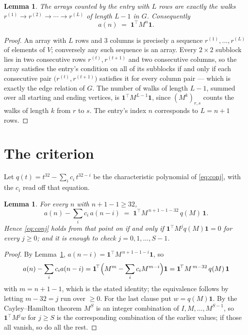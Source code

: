 \documentclass[11pt,a4paper]{article}
\theoremstyle{plain}
\newtheorem{lemma}[theorem]{Lemma}
\theoremstyle{definition}
\begin{document}
\begin{lemma}\label{lem:walk}
The arrays counted by the entry with $L$ rows are exactly the walks
$r^{(1)}\to r^{(2)}\to\cdots\to r^{(L)}$ of length $L-1$ in $G$. Consequently
\[
a(n)\;=\;\mathbf{1}^{\!\top}M^{n}\mathbf{1} .
\]
\end{lemma}

\begin{proof}
An array with $L$ rows and $3$ columns is precisely a sequence
$r^{(1)},\dots,r^{(L)}$ of elements of $V$; conversely any such sequence is an array.
Every $2\times2$ subblock lies in two consecutive rows $r^{(t)},r^{(t+1)}$ and two
consecutive columns, so the array satisfies the entry's condition on all of its subblocks
if and only if each consecutive pair $\bigl(r^{(t)},r^{(t+1)}\bigr)$ satisfies it for
every column pair --- which is exactly the edge relation of $G$. The number of walks of
length $L-1$, summed over all starting and ending vertices, is
$\mathbf{1}^{\!\top}M^{L-1}\mathbf{1}$, since $(M^{k})_{r,s}$ counts the walks of
length $k$ from $r$ to $s$. The entry's index $n$ corresponds to $L=n+1$ rows.
\end{proof}

\section{The criterion}

Let $q(t)=t^{32}-\sum_i c_i\,t^{32-i}$ be the characteristic polynomial of
\eqref{eq:conj}, with the $c_i$ read off that equation.

\begin{lemma}\label{lem:crit}
For every $n$ with $n+1-1\ge32$,
\[
a(n)-\sum_i c_i\,a(n-i)\;=\;\mathbf{1}^{\!\top}M^{\,n+1-1-32}\,q(M)\,\mathbf{1} .
\]
Hence \eqref{eq:conj} holds from that point on if and only if
$\mathbf{1}^{\!\top}M^{j}q(M)\mathbf{1}=0$ for every $j\ge0$; and it is enough to check
$j=0,1,\dots,S-1$.
\end{lemma}

\begin{proof}
By Lemma~\ref{lem:walk}, $a(n-i)=\mathbf{1}^{\!\top}M^{\,n+1-1-i}\mathbf{1}$, so
\[
a(n)-\sum_i c_i a(n-i)
=\mathbf{1}^{\!\top}\Bigl(M^{m}-\sum_i c_i M^{m-i}\Bigr)\mathbf{1}
=\mathbf{1}^{\!\top}M^{\,m-32}\,q(M)\,\mathbf{1}
\]
with $m=n+1-1$, which is the stated identity; the equivalence follows by letting
$m-32=j$ run over $\ge0$. For the last clause put $w=q(M)\mathbf{1}$. By the
Cayley--Hamilton theorem $M^{S}$ is an integer combination of $I,M,\dots,M^{S-1}$, so
$\mathbf{1}^{\!\top}M^{j}w$ for $j\ge S$ is the corresponding combination of the earlier
values; if those all vanish, so do all the rest.
\end{proof}
\end{document}
